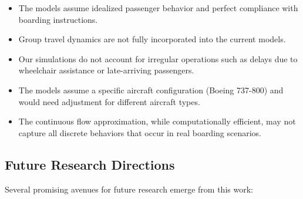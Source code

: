 \documentclass[12pt]{article}
\begin{document}
\begin{itemize}
    \item The models assume idealized passenger behavior and perfect compliance with boarding instructions.
    
    \item Group travel dynamics are not fully incorporated into the current models.
    
    \item Our simulations do not account for irregular operations such as delays due to wheelchair assistance or late-arriving passengers.
    
    \item The models assume a specific aircraft configuration (Boeing 737-800) and would need adjustment for different aircraft types.
    
    \item The continuous flow approximation, while computationally efficient, may not capture all discrete behaviors that occur in real boarding scenarios.
\end{itemize}

\subsection{Future Research Directions}

Several promising avenues for future research emerge from this work:
\end{document}
